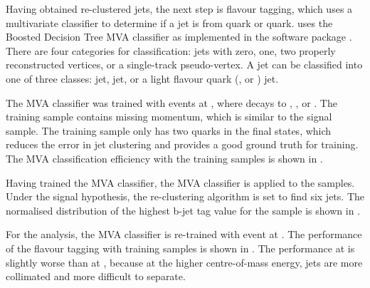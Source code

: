 Having obtained re-clustered jets, the next step is flavour tagging, which uses a multivariate classifier to determine if a jet is from \Pbottom quark or \Pcharm quark. \lcfiplus uses the Boosted Decision Tree MVA \multiclass classifier as implemented in the \TMVA software package \cite{Hocker:2007ht}. There are four categories for classification:  jets with zero, one, two properly reconstructed vertices, or a single-track pseudo-vertex. A jet can be classified into one of three classes: \Pbottom jet, \Pcharm jet, or a light flavour quark (\Pup, \Pdown or \Pstrange) jet.

The MVA \multiclass classifier was trained with \HepProcess{\Pep \Pem \to \PZ \APnu \Pnu} events at , where \PZ decays to \HepProcess{\Pbottom\APbottom}, \HepProcess{\Pcharm\APcharm}, or \HepProcess{\Pup\APup/\Pdown\APdown/\Pstrange\APstrange}. The training sample contains missing momentum, which is similar to the signal sample. The training sample only has two quarks in the final states, which reduces the error in jet clustering and provides a good ground truth for training. The MVA classification efficiency with the training samples is shown in .

Having trained the MVA classifier, the MVA classifier is applied to the samples. Under the signal hypothesis, the re-clustering algorithm is set to find six jets. The normalised distribution of the highest b-jet tag value for the \eeToHHbbWWHad sample is shown in .

For the  analysis, the MVA classifier is re-trained with  \HepProcess{\Pep \Pem \to \PZ \APnu \Pnu} event at . The performance of the flavour tagging  with training samples is shown in . The performance at  is slightly worse than at , because at the higher centre-of-mass energy, jets are more collimated and more difficult to separate.





